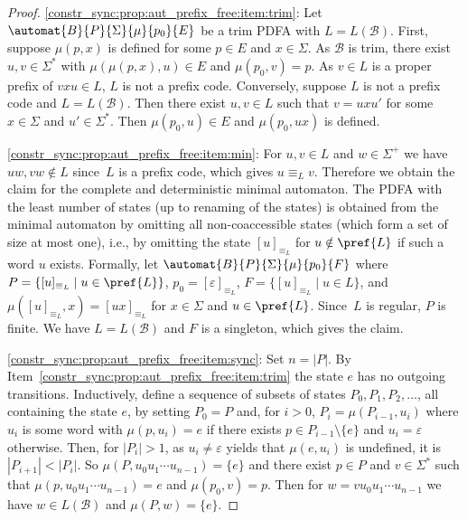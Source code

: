 \begin{proof}
	\ref{constr_sync:prop:aut_prefix_free:item:trim}: Let $\automat{B}{P}{\Sigma}{\mu}{p_0}{E}$ be a trim PDFA with $L = L(\mathcal B)$.
	First, suppose $\mu(p, x)$ is defined for some $p \in E$ and $x \in \Sigma$.
	As $\mathcal B$ is trim, 
	there exist $u,v \in \Sigma^*$
	with $\mu(\mu(p, x), u) \in E$ and $\mu(p_0, v) = p$.
	As $v \in L$ is a proper prefix of $vxu \in L$, $L$ is not a prefix code.
	Conversely, suppose $L$ is not a prefix code and $L = L(\mathcal B)$.
	Then there exist $u,v \in L$
	such that $v = uxu'$ for some $x \in \Sigma$ and $u' \in \Sigma^*$.
	Then $\mu(p_0, u) \in E$ and $\mu(p_0, ux)$ is defined.
	
	\ref{constr_sync:prop:aut_prefix_free:item:min}: 
	For $u,v \in L$ and $w \in \Sigma^+$
	we have $uw, vw \notin L$ since~$L$ is a prefix code,
	which gives $u \equiv_L v$. Therefore we obtain the claim
	for the complete and deterministic minimal automaton.
	The PDFA with the least number of states (up to renaming of the states)
	is obtained from the minimal automaton by omitting
	all non-coaccessible states (which form a set of size at most one), i.e.,
	by omitting the state $[u]_{\equiv_L}$ for $u \notin \pref{L}$
	if such a word $u$ exists. Formally, 
	let $\automat{B}{P}{\Sigma}{\mu}{p_0}{F}$
	where $P = \{ [u]_{\equiv_L} \mid u \in \pref{L} \}$, $p_0 = [\varepsilon]_{\equiv_L}$,
	$F = \{ [u]_{\equiv_L} \mid u \in L \}$,
	and $\mu([u]_{\equiv_L}, x) = [ux]_{\equiv_L}$ for $x \in \Sigma$ and $u \in \pref{L}$. Since~$L$ is regular, $P$ is finite.
	We have $L = L(\mathcal B)$ and $F$ is a singleton, which gives the claim.
		
	\ref{constr_sync:prop:aut_prefix_free:item:sync}: Set $n = |P|$. By Item~\ref{constr_sync:prop:aut_prefix_free:item:trim}
	the state $e$ has no outgoing transitions.
	Inductively, define a sequence of subsets of states $P_0, P_1, P_2, \ldots$, all containing the state $e$, %
	by setting $P_0 = P$
	and, for $i > 0$, $P_i = \mu(P_{i-1}, u_i)$
	where $u_i$ is some word with $\mu(p, u_i) = e$ if there exists $p \in P_{i-1} \setminus \{e\}$
	and $u_i = \varepsilon$ otherwise.
	Then, for $|P_i| > 1$, as $u_i \ne \varepsilon$ yields that $\mu(e, u_i)$ is undefined,
	it is $|P_{i+1}| < |P_i|$.
	So $\mu(P, u_0 u_1 \cdots u_{n-1}) = \{e\}$ and there exist $p \in P$ and $v \in \Sigma^*$
	such that $\mu(p, u_0 u_1 \cdots u_{n-1}) = e$ and $\mu(p_0, v) = p$.
	Then for $w = vu_0 u_1 \cdots u_{n-1}$ we have $w \in L(\mathcal B)$ and $\mu(P, w) = \{e\}$.				
\end{proof}

